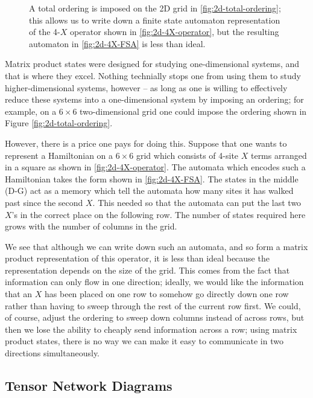 \documentclass[12pt]{amsbook}
\theoremstyle{plain}
\theoremstyle{definition}
\theoremstyle{remark}
\begin{document}
\begin{figure}
\caption{A total ordering is imposed on the 2D grid in \ref{fig:2d-total-ordering};  this allows us to write down a finite state automaton representation of the 4-$X$ operator shown in \ref{fig:2d-4X-operator}, but the resulting automaton in \ref{fig:2d-4X-FSA} is less than ideal.}
\end{figure}

Matrix product states were designed for studying one-dimensional systems, and that is where they excel.  Nothing technially stops one from using them to study higher-dimensional systems, however -- as long as one is willing to effectively reduce these systems into a one-dimensional system by imposing an ordering; for example, on a $6\times 6$ two-dimensional grid one could impose the ordering shown in Figure \ref{fig:2d-total-ordering}.

However, there is a price one pays for doing this.  Suppose that one wants to represent a Hamiltonian on a $6\times 6$ grid which consists of 4-site $X$ terms arranged in a square as shown in \ref{fig:2d-4X-operator}. The automata which encodes such a Hamiltonian takes the form shown in \ref{fig:2d-4X-FSA}.  The states in the middle (D-G) act as a memory which tell the automata how many sites it has walked past since the second $X$.  This needed so that the automata can put the last two $X$'s in the correct place on the following row.  The number of states required here grows with the number of columns in the grid.

We see that although we can write down such an automata, and so form a matrix product representation of this operator, it is less than ideal because the representation depends on the size of the grid.  This comes from the fact that information can only flow in one direction;  ideally, we would like the information that an $X$ has been placed on one row to somehow go directly down one row rather than having to sweep through the rest of the current row first.  We could, of course, adjust the ordering to sweep down columns instead of across rows, but then we lose the ability to cheaply send information across a row;  using matrix product states, there is no way we can make it easy to communicate in two directions simultaneously.
\subsection{Tensor Network Diagrams}

\label{tensordiagram}
\end{document}
